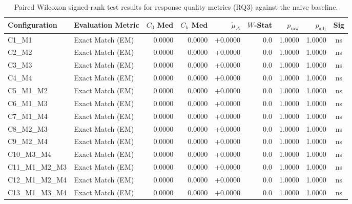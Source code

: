 \begin{table}[p]
\centering
\scriptsize
\setlength{\tabcolsep}{2.4pt}
\renewcommand{\arraystretch}{0.92}
\caption{Paired Wilcoxon signed-rank test results for response quality metrics (RQ3) against the naive baseline.}
\label{tab:wilcoxon_rq3}
\begin{tabular*}{\textwidth}{@{\extracolsep{\fill}} l l r r r r r r c @{}}
\toprule
\textbf{Configuration} & \textbf{Evaluation Metric} & \textbf{$C_0$ Med} & \textbf{$C_k$ Med} & \textbf{$\tilde{\mu}_\Delta$} & \textbf{$W$-Stat} & \textbf{$p_{\text{raw}}$} & \textbf{$p_{\text{adj}}$} & \textbf{Sig} \\
\midrule
C1\_M1          & Exact Match (EM)     & 0.0000 & 0.0000 & +0.0000 & 0.0 & 1.0000 & 1.0000 & ns \\
\addlinespace
C2\_M2          & Exact Match (EM)     & 0.0000 & 0.0000 & +0.0000 & 0.0 & 1.0000 & 1.0000 & ns \\
\addlinespace
C3\_M3          & Exact Match (EM)     & 0.0000 & 0.0000 & +0.0000 & 0.0 & 1.0000 & 1.0000 & ns \\
\addlinespace
C4\_M4          & Exact Match (EM)     & 0.0000 & 0.0000 & +0.0000 & 0.0 & 1.0000 & 1.0000 & ns \\
\addlinespace
C5\_M1\_M2      & Exact Match (EM)     & 0.0000 & 0.0000 & +0.0000 & 0.0 & 1.0000 & 1.0000 & ns \\
\addlinespace
C6\_M1\_M3      & Exact Match (EM)     & 0.0000 & 0.0000 & +0.0000 & 0.0 & 1.0000 & 1.0000 & ns \\
\addlinespace
C7\_M1\_M4      & Exact Match (EM)     & 0.0000 & 0.0000 & +0.0000 & 0.0 & 1.0000 & 1.0000 & ns \\
\addlinespace
C8\_M2\_M3      & Exact Match (EM)     & 0.0000 & 0.0000 & +0.0000 & 0.0 & 1.0000 & 1.0000 & ns \\
\addlinespace
C9\_M2\_M4      & Exact Match (EM)     & 0.0000 & 0.0000 & +0.0000 & 0.0 & 1.0000 & 1.0000 & ns \\
\addlinespace
C10\_M3\_M4     & Exact Match (EM)     & 0.0000 & 0.0000 & +0.0000 & 0.0 & 1.0000 & 1.0000 & ns \\
\addlinespace
C11\_M1\_M2\_M3 & Exact Match (EM)     & 0.0000 & 0.0000 & +0.0000 & 0.0 & 1.0000 & 1.0000 & ns \\
\addlinespace
C12\_M1\_M2\_M4 & Exact Match (EM)     & 0.0000 & 0.0000 & +0.0000 & 0.0 & 1.0000 & 1.0000 & ns \\
\addlinespace
C13\_M1\_M3\_M4 & Exact Match (EM)     & 0.0000 & 0.0000 & +0.0000 & 0.0 & 1.0000 & 1.0000 & ns \\

\end{tabular*}
\end{table}
